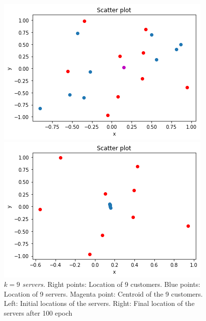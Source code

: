 \documentclass{article}
\begin{document}
\begin{figure}[!ht]
	\begin{minipage}{0.5\linewidth}
		\centering
		\includegraphics[scale=0.3]{9s0}
	\end{minipage}%
	\begin{minipage}{0.5\linewidth}
		\centering
		\includegraphics[scale=0.3]{9s10}
	\end{minipage}%
	\caption{\textit{$k=9$ servers.} Right points: Location of 9 customers. Blue points: Location of 9 servers. Magenta point: Centroid of the 9 customers. Left: Initial locations of the servers. Right: Final location of the servers after 100 epoch}
		\label{fig:9s}
	\end{figure}
\end{document}
